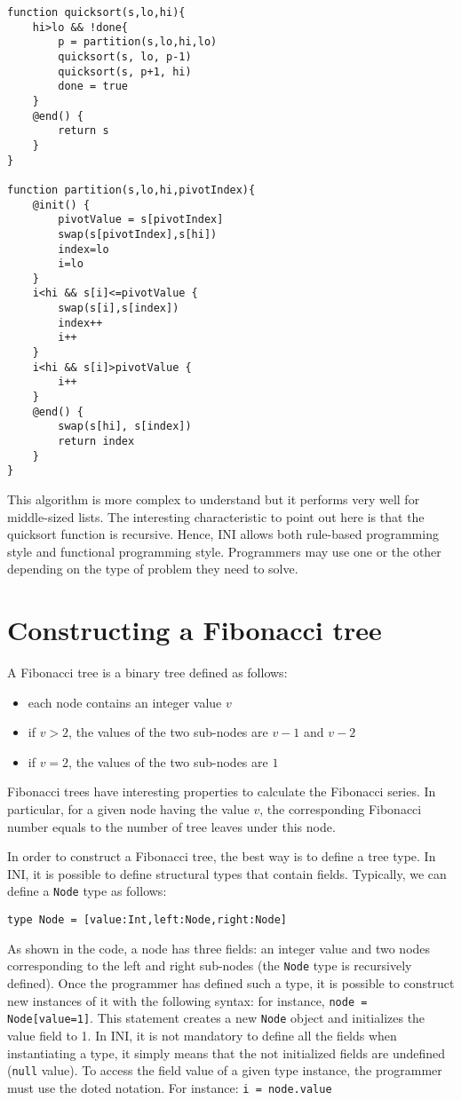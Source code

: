 \documentclass[11pt]{report}
\begin{document}
\begin{lstlisting}
function quicksort(s,lo,hi){
	hi>lo && !done{
		p = partition(s,lo,hi,lo)
		quicksort(s, lo, p-1)
		quicksort(s, p+1, hi)
		done = true
	}
	@end() {
		return s
	}
}

function partition(s,lo,hi,pivotIndex){
	@init() {
		pivotValue = s[pivotIndex]
		swap(s[pivotIndex],s[hi])
		index=lo
		i=lo
	}
	i<hi && s[i]<=pivotValue {
		swap(s[i],s[index])
		index++
		i++
	}
	i<hi && s[i]>pivotValue {
		i++
	}
	@end() {
		swap(s[hi], s[index])
		return index
	}
}
\end{lstlisting}

This algorithm is more complex to understand but it performs very well for middle-sized lists. The interesting characteristic to point out here is that the quicksort function is recursive. Hence, INI allows both rule-based programming style and functional programming style. Programmers may use one or the other depending on the type of problem they need to solve.

\section{Constructing a Fibonacci tree}

A Fibonacci tree is a binary tree defined as follows:

\begin{itemize}
\item each node contains an integer value $v$
\item if $v>2$, the values of the two sub-nodes are $v-1$ and $v-2$
\item if $v=2$, the values of the two sub-nodes are $1$
\end{itemize}

Fibonacci trees have interesting properties to calculate the Fibonacci series. In particular, for a given node having the value $v$, the corresponding Fibonacci number equals to the number of tree leaves under this node.

In order to construct a Fibonacci tree, the best way is to define a tree type. In INI, it is possible to define structural types that contain fields. Typically, we can define a \texttt{Node} type as follows:

\begin{lstlisting}[numbers=none]
type Node = [value:Int,left:Node,right:Node]
\end{lstlisting}

As shown in the code, a node has three fields: an integer value and two nodes corresponding to the left and right sub-nodes (the \texttt{Node} type is recursively defined). Once the programmer has defined such a type, it is possible to construct new instances of it with the following syntax: for instance, \texttt{node = Node[value=1]}. This statement creates a new \texttt{Node} object and initializes the value field to 1. In INI, it is not mandatory to define all the fields when instantiating a type, it simply means that the not initialized fields are undefined (\texttt{null} value). To access the field value of a given type instance, the programmer must use the doted notation. For instance: \texttt{i = node.value}
\end{document}
